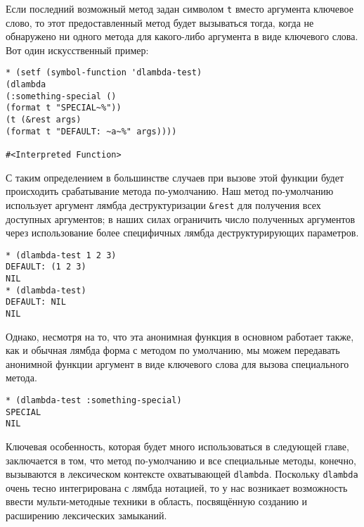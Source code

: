 Если последний возможный метод задан символом \verb"t" вместо аргумента ключевое слово, то этот предоставленный метод будет вызываться тогда, когда не обнаружено ни одного метода для какого-либо аргумента в виде ключевого слова. Вот один искусственный пример:

\begin{verbatim}
* (setf (symbol-function 'dlambda-test)
(dlambda
(:something-special ()
(format t "SPECIAL~%"))
(t (&rest args)
(format t "DEFAULT: ~a~%" args))))

#<Interpreted Function>
\end{verbatim}

С таким определением в большинстве случаев при вызове этой функции будет происходить срабатывание метода по-умолчанию. Наш метод по-умолчанию использует аргумент лямбда деструктуризации \verb"&rest" для получения всех доступных аргументов; в наших силах ограничить число полученных аргументов через использование более специфичных лямбда деструктурирующих параметров.

\begin{verbatim}
* (dlambda-test 1 2 3)
DEFAULT: (1 2 3)
NIL
* (dlambda-test)
DEFAULT: NIL
NIL
\end{verbatim}

Однако, несмотря на то, что эта анонимная функция в основном работает также, как и обычная лямбда форма с методом по умолчанию, мы можем передавать анонимной функции аргумент в виде ключевого слова для вызова специального метода.

\begin{verbatim}
* (dlambda-test :something-special)
SPECIAL
NIL
\end{verbatim}

Ключевая особенность, которая будет много использоваться в следующей главе, заключается в том, что метод по-умолчанию и все специальные методы, конечно, вызываются в лексическом контексте охватывающей \verb"dlambda". Поскольку \verb"dlambda" очень тесно интегрирована с лямбда нотацией, то у нас возникает возможность ввести мульти-методные техники в область, посвящённую созданию и расширению лексических замыканий.
